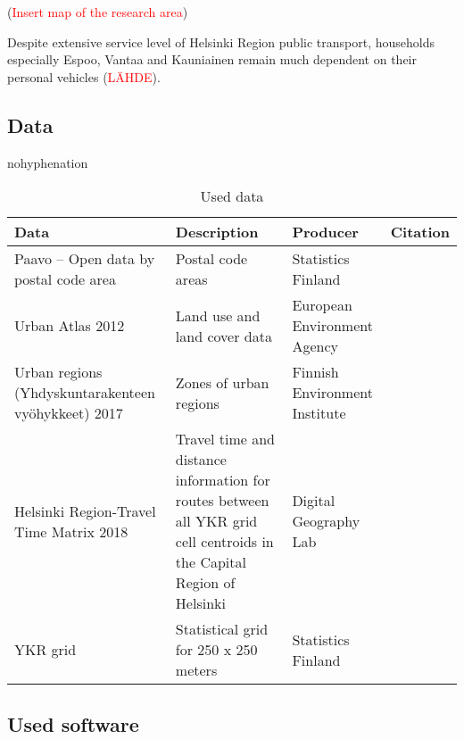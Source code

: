 (\textcolor{red}{Insert map of the research area})

Despite extensive service level of Helsinki Region public transport, households especially Espoo, Vantaa and Kauniainen remain much dependent on their personal vehicles (\textcolor{red}{LÄHDE}). 

\subsection{Data}
\justify

\begin{hyphenrules}{nohyphenation}
    \begin{table}[H]
        \centering
        \setlength\tabcolsep{1pt}
        \caption{Used data} \label{tab:useddata}
        \begin{tabular}{ @{} >{\raggedright\arraybackslash}p{4cm} >{\raggedright\arraybackslash}p{4cm} >{\raggedright\arraybackslash}p{4cm} >{\raggedleft\arraybackslash}p{2cm} @{} }
            \toprule
            \cmidrule(r){1-2}
            Data & Description & Producer & Citation \\
            \midrule
            Paavo -- Open data by postal code area & Postal code areas & Statistics Finland & 2 \\
            Urban Atlas 2012 & Land use and land cover data & European Environment Agency & \cite{EuropeanEnvironmentAgency2016Urban2012} \\
            Urban regions (Yhdyskuntarakenteen vyöhykkeet) 2017 & Zones of urban regions & Finnish Environment Institute & 1 \\
            Helsinki Region-Travel Time Matrix 2018 & Travel time and distance information for routes between all YKR grid cell centroids in the Capital Region of Helsinki & Digital Geography Lab & \cite{Tenkanen2018Helsinki2018} \\
            YKR grid & Statistical grid for 250 x 250 meters & Statistics Finland & 2 \\
            \bottomrule
        \end{tabular}
    \end{table} 
\end{hyphenrules}

\subsection{Used software}
\justify

